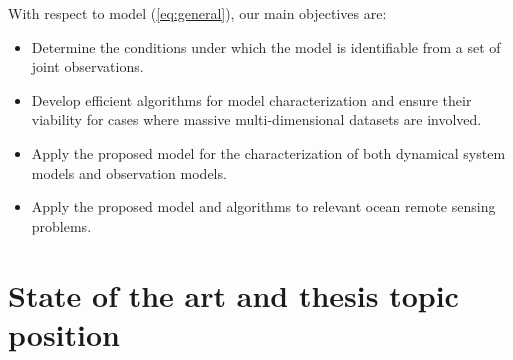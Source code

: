 \documentclass[10pt]{extarticle}
\begin{document}
With respect to model (\ref{eq:general}), our main objectives are:
\begin{itemize}
    \itemsep 0em 
     \item Determine the conditions under which the model is identifiable from a set of joint observations. %
    \item Develop efficient algorithms for model characterization and ensure their viability for cases where massive multi-dimensional datasets are involved.
    \item Apply the proposed model for the characterization of both dynamical system models and observation models.
    \item Apply the proposed model and algorithms to relevant ocean remote sensing problems. %
\end{itemize}
\section*{State of the art and thesis topic position}
\end{document}
